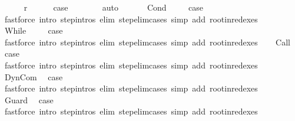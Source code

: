 \begin{isabellebody}
\isanewline
\ \ \ \ \isamarkupfalse%
\ r{\isacharprime}\isanewline
\ \ \ \ \isamarkupfalse%
\ {\isacharquery}case\isanewline
\ \ \ \ \ \ \isamarkupfalse%
\ auto\isanewline
\ \ \isamarkupfalse%
\isanewline
{}\isamarkupfalse%
\isanewline
\ \ \isamarkupfalse%
\ Cond\ \isanewline
\ \ \isamarkupfalse%
\ {\isacharquery}case\ \isanewline
\ \ \ \ \isamarkupfalse%
\ {\isacharparenleft}fastforce\ intro{\isacharcolon}\ step{\isachardot}intros\ elim{\isacharcolon}\ step{\isacharunderscore}elim{\isacharunderscore}cases\ simp\ add{\isacharcolon}\ root{\isacharunderscore}in{\isacharunderscore}redexes{\isacharparenright}\isanewline
{}\isamarkupfalse%
\isanewline
\ \ \isamarkupfalse%
\ While\ \isanewline
\ \ \isamarkupfalse%
\ {\isacharquery}case\ \isanewline
\ \ \ \ \isamarkupfalse%
\ {\isacharparenleft}fastforce\ intro{\isacharcolon}\ step{\isachardot}intros\ elim{\isacharcolon}\ step{\isacharunderscore}elim{\isacharunderscore}cases\ simp\ add{\isacharcolon}\ root{\isacharunderscore}in{\isacharunderscore}redexes{\isacharparenright}\isanewline
{}\isamarkupfalse%
\isanewline
\ \ \isamarkupfalse%
\ Call\ \isamarkupfalse%
\ {\isacharquery}case\ \isanewline
\ \ \ \ \isamarkupfalse%
\ {\isacharparenleft}fastforce\ intro{\isacharcolon}\ step{\isachardot}intros\ elim{\isacharcolon}\ step{\isacharunderscore}elim{\isacharunderscore}cases\ simp\ add{\isacharcolon}\ root{\isacharunderscore}in{\isacharunderscore}redexes{\isacharparenright}\isanewline
{}\isamarkupfalse%
\isanewline
\ \ \isamarkupfalse%
\ DynCom\ \isamarkupfalse%
\ {\isacharquery}case\ \isanewline
\ \ \ \ \isamarkupfalse%
\ {\isacharparenleft}fastforce\ intro{\isacharcolon}\ step{\isachardot}intros\ elim{\isacharcolon}\ step{\isacharunderscore}elim{\isacharunderscore}cases\ simp\ add{\isacharcolon}\ root{\isacharunderscore}in{\isacharunderscore}redexes{\isacharparenright}\isanewline
{}\isamarkupfalse%
\isanewline
\ \ \isamarkupfalse%
\ Guard\ \isamarkupfalse%
\ {\isacharquery}case\ \isanewline
\ \ \ \ \isamarkupfalse%
\ {\isacharparenleft}fastforce\ intro{\isacharcolon}\ step{\isachardot}intros\ elim{\isacharcolon}\ step{\isacharunderscore}elim{\isacharunderscore}cases\ simp\ add{\isacharcolon}\ root{\isacharunderscore}in{\isacharunderscore}redexes{\isacharparenright}\isanewline

\end{isabellebody}
